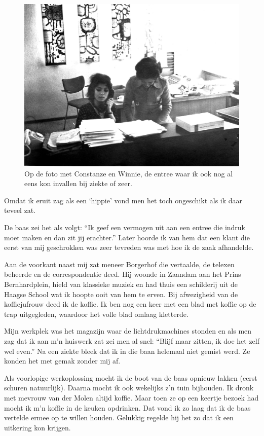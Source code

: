 \documentclass[10pt,twoside, openright]{memoir}
\begin{document}
\begin{figure}[t]
\includegraphics[width=\textwidth]{img/ch40/molenvd}
\caption*{\footnotesize Op de foto met Constanze en Winnie, de entree waar ik ook nog al eens kon invallen bij ziekte of zeer.}
\end{figure}

Omdat ik eruit zag als een `hippie' vond men het toch ongeschikt als ik daar teveel zat.

De baas zei het als volgt: ``Ik geef een vermogen uit aan een entree die indruk moet maken en dan zit jij erachter.'' Later hoorde ik van hem dat een klant die eerst van mij geschrokken was zeer tevreden was met hoe ik de zaak afhandelde.

Aan de voorkant naast mij zat meneer Borgerhof die vertaalde, de telexen beheerde en de correspondentie deed. Hij woonde in Zaandam aan het Prins Bernhardplein, hield van klassieke muziek en had thuis een schilderij uit de Haagse School wat ik hoopte ooit van hem te erven. Bij afwezigheid van de koffiejufrouw deed ik de koffie. Ik ben nog een keer met een blad met koffie op de trap uitgegleden, waardoor het volle blad omlaag kletterde.

Mijn werkplek was het magazijn waar de lichtdrukmachines stonden en als men zag dat ik aan m'n huiswerk zat zei men al snel: ``Blijf maar zitten, ik doe het zelf wel even.'' Na een ziekte bleek dat ik in die baan helemaal niet gemist werd. Ze konden het met gemak zonder mij af.

Als voorlopige werkoplossing mocht ik de boot van de baas opnieuw lakken (eerst schuren natuurlijk). Daarna mocht ik ook wekelijks z’n tuin bijhouden. Ik dronk met mevrouw van der Molen altijd koffie. Maar toen ze op een keertje bezoek had mocht ik m’n koffie in de keuken opdrinken. Dat vond ik zo laag dat ik de baas vertelde ermee op te willen houden. Gelukkig regelde hij het zo dat ik een uitkering kon krijgen. 
\end{document}
